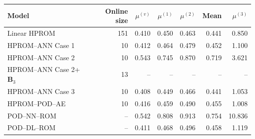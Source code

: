 \begin{tabular}{lr|rrrr|r}
\toprule
Model & Online size & $\mu^{(v)}$ & $\mu^{(1)}$ & $\mu^{(2)}$ & Mean & $\mu^{(3)}$ \\
\midrule
Linear HPROM & 151 & 0.410 & 0.450 & 0.463 & 0.441 & 0.850 \\
HPROM--ANN Case 1 & 10 & 0.412 & 0.464 & 0.479 & 0.452 & 1.100 \\
HPROM--ANN Case 2 & 10 & 0.543 & 0.745 & 0.870 & 0.719 & 3.621 \\
HPROM--ANN Case 2+$\mathbf B_3$ & 13 & -- & -- & -- & -- & -- \\
HPROM--ANN Case 3 & 10 & 0.408 & 0.449 & 0.466 & 0.441 & 1.053 \\
HPROM--POD--AE & 10 & 0.416 & 0.459 & 0.490 & 0.455 & 1.008 \\
\midrule
POD--NN--ROM & -- & 0.542 & 0.808 & 0.913 & 0.754 & 10.836 \\
POD--DL--ROM & -- & 0.411 & 0.468 & 0.496 & 0.458 & 1.119 \\
\bottomrule
\end{tabular}

